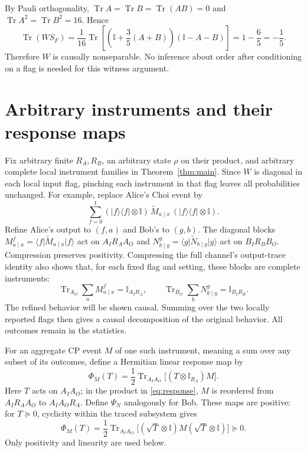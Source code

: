 \documentclass[11pt,letterpaper]{article}
\theoremstyle{remark}\newtheorem{remark}[theorem]{Remark}
\newcommand{\Tr}{\operatorname{Tr}}
\newcommand{\I}{\mathbb I}
\newcommand{\ket}[1]{\lvert#1\rangle}
\newcommand{\bra}[1]{\langle#1\rvert}
\begin{document}
By Pauli orthogonality, $\Tr A=\Tr B=\Tr(AB)=0$ and
$\Tr A^2=\Tr B^2=16$. Hence
\begin{equation}\label{eq:negative}
 \Tr(WS_F)=\frac1{16}\Tr\left[
     \left(\I+\frac35(A+B)\right)(\I-A-B)\right]
 =1-\frac65=-\frac15.
\end{equation}
Therefore $W$ is causally nonseparable. No inference about order after conditioning on a flag is needed for this witness argument.

\section{Arbitrary instruments and their response maps}\label{sec:maps}

Fix arbitrary finite $R_A,R_B$, an arbitrary state $\rho$ on their product, and arbitrary complete local instrument families in Theorem~\ref{thm:main}. Since $W$ is diagonal in each local input flag, pinching each instrument in that flag leaves all probabilities unchanged. For example, replace Alice's Choi event by
\[
 \sum_{f=0}^1(\ket f\bra f\otimes\I)\,
 \widetilde M_{a\mid x}\,(\ket f\bra f\otimes\I).
\]
Refine Alice's output to $(f,a)$ and Bob's to $(g,b)$. The diagonal blocks
$M^f_{a\mid x}=\bra f\widetilde M_{a\mid x}\ket f$ act on $A_I R_A A_O$ and
$N^g_{b\mid y}=\bra g\widetilde N_{b\mid y}\ket g$ act on $B_I R_B B_O$.
Compression preserves positivity. Compressing the full channel's output-trace identity also shows that, for each fixed flag and setting, these blocks are complete instruments:
\[
 \Tr_{A_O}\sum_aM^f_{a\mid x}=\I_{A_I R_A},
 \qquad
 \Tr_{B_O}\sum_bN^g_{b\mid y}=\I_{B_I R_B}.
\]
The refined behavior will be shown causal. Summing over the two locally reported flags then gives a causal decomposition of the original behavior. All outcomes remain in the statistics.

For an aggregate CP event $M$ of one such instrument, meaning a sum over any subset of its outcomes, define a Hermitian linear response map by
\begin{equation}\label{eq:response}
 \Phi_M(T)=\frac12\Tr_{A_I A_O}\bigl[(T\otimes\I_{R_A})M\bigr].
\end{equation}
Here $T$ acts on $A_I A_O$; in the product in \eqref{eq:response}, $M$ is reordered from $A_I R_A A_O$ to $A_I A_O R_A$. Define $\Psi_N$ analogously for Bob. These maps are positive: for $T\succeq0$, cyclicity within the traced subsystem gives
\[
 \Phi_M(T)=\frac12\Tr_{A_I A_O}
 \bigl[(\sqrt T\otimes\I)M(\sqrt T\otimes\I)\bigr]\succeq0.
\]
Only positivity and linearity are used below.
\end{document}
